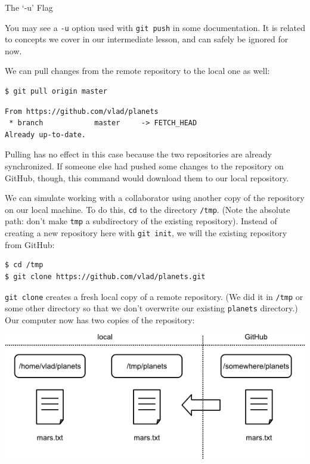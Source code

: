 \documentclass{book}
\begin{document}
\begin{swcbox}{The `-u' Flag}

You may see a \texttt{-u} option used with \texttt{git push} in some
documentation. It is related to concepts we cover in our intermediate
lesson, and can safely be ignored for now.

\end{swcbox}

We can pull changes from the remote repository to the local one as well:

\begin{verbatim}
$ git pull origin master
\end{verbatim}

\begin{verbatim}
From https://github.com/vlad/planets
 * branch            master     -> FETCH_HEAD
Already up-to-date.
\end{verbatim}

Pulling has no effect in this case because the two repositories are
already synchronized. If someone else had pushed some changes to the
repository on GitHub, though, this command would download them to our
local repository.

We can simulate working with a collaborator using another copy of the
repository on our local machine. To do this, \texttt{cd} to the
directory \texttt{/tmp}. (Note the absolute path: don't make
\texttt{tmp} a subdirectory of the existing repository). Instead of
creating a new repository here with \texttt{git init}, we will
 the existing repository from
GitHub:

\begin{verbatim}
$ cd /tmp
$ git clone https://github.com/vlad/planets.git
\end{verbatim}

\texttt{git clone} creates a fresh local copy of a remote repository.
(We did it in \texttt{/tmp} or some other directory so that we don't
overwrite our existing \texttt{planets} directory.) Our computer now has
two copies of the repository:

\includegraphics{novice/git/img/git-after-duplicate-clone.png}
\end{document}
